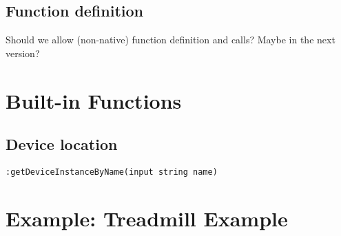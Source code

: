 \documentclass{myproc}
\begin{document}
\subsection{Function definition}
Should we allow (non-native) function definition and calls?
Maybe in the next version?



\section{Built-in Functions}
\subsection{Device location}
\bit
\w \verb+:getDeviceInstanceByName(input string name)+
\eit


\section{Example: Treadmill Example}

\tableofcontents

%
%
\end{document}

